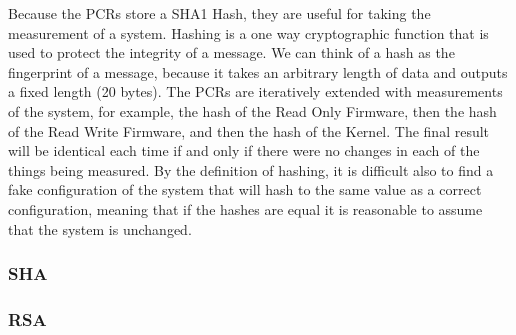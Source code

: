 \documentclass[../report.tex]{subfiles}
\begin{document}
Because the PCRs store a SHA1 Hash, they are useful for taking the measurement of a system.  
Hashing is a one way cryptographic function that is used to protect the integrity of a message.
We can think of a hash as the fingerprint of a message, because it takes an arbitrary length of data and outputs a fixed length (20 bytes).
The PCRs are iteratively extended with measurements of the system, for example, the hash of the Read Only Firmware, then the hash of the Read Write Firmware, and then the hash of the Kernel.
The final result will be identical each time if and only if there were no changes in each of the things being measured.
By the definition of hashing, it is difficult also to find a fake configuration of the system that will hash to the same value as a correct configuration, meaning that if the hashes are equal it is reasonable to assume that the system is unchanged. 

\subsubsection{SHA}
\subsubsection{RSA}
\end{document}
